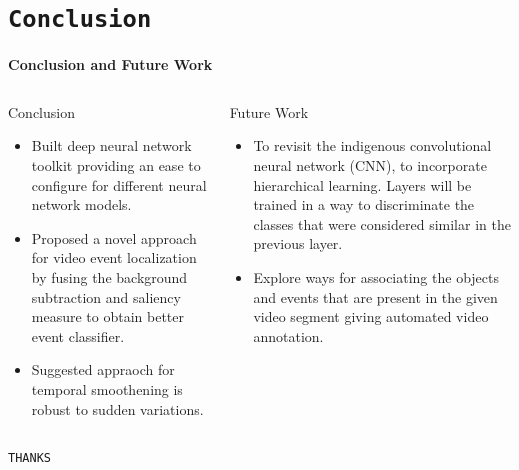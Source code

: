 \section{\texttt{Conclusion}}
\begin{frame}{\textbf{Conclusion and Future Work}}
\begin{columns}
	\begin{column}{0.48\textwidth}
		\begin{varblock}[\textwidth]{Conclusion}
		\begin{itemize}
			\item Built deep neural network toolkit providing an ease to configure for different neural network models.
			\item Proposed a novel approach for video event localization by fusing the background subtraction and saliency measure to obtain better event classifier.
			\item Suggested appraoch for temporal smoothening is robust to sudden variations.
		\end{itemize}
		\end{varblock}
	\end{column}	
	\begin{column}{0.48\textwidth}
		\begin{varblock}[\textwidth]{Future Work}
		\begin{itemize}
			\item To revisit the indigenous convolutional neural network (CNN), to incorporate hierarchical learning. Layers will be trained in a way to discriminate the classes that were considered similar in the previous layer.
			\item Explore ways for associating the objects and events that are present
in the given video segment giving automated video annotation.
		\end{itemize}
		\end{varblock}
	\end{column}
\end{columns}
\end{frame}
\begin{frame}[plain]
	\begin{center}
	\begin{Huge}
		{\color{green}\texttt{THANKS}}
	\end{Huge}
	\end{center}
\end{frame}